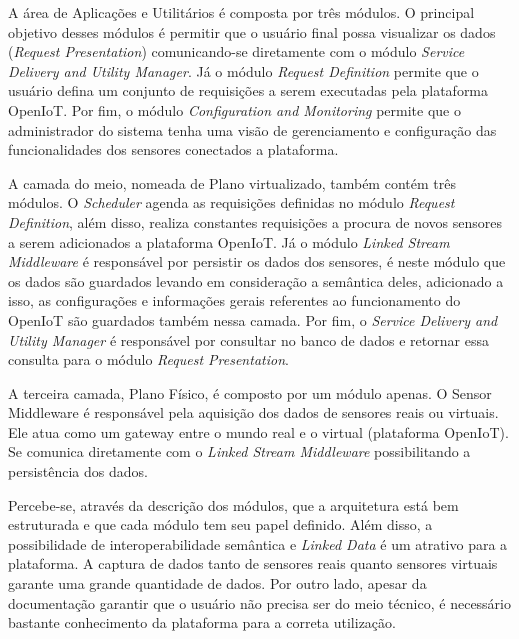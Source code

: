     
A área de Aplicações e Utilitários é composta por três módulos. O principal
objetivo desses módulos é permitir que o usuário final possa visualizar os
dados (\textit{Request Presentation}) comunicando-se diretamente com o módulo
\textit{Service Delivery and Utility Manager}.  Já o módulo \textit{Request
Definition} permite que o usuário defina um conjunto de requisições a serem
executadas pela plataforma OpenIoT. Por fim, o módulo \textit{Configuration and
Monitoring} permite que o administrador do sistema tenha uma visão de
gerenciamento e configuração das funcionalidades dos sensores conectados a
plataforma. 

A camada do meio, nomeada de Plano virtualizado, também contém três módulos. O
\textit{Scheduler} agenda as requisições definidas no módulo \textit{Request
Definition}, além disso, realiza constantes requisições a procura de novos
sensores a serem adicionados a plataforma OpenIoT. Já o módulo \textit{Linked
Stream Middleware} é responsável por persistir os dados dos sensores, é neste
módulo que os dados são guardados levando em consideração a semântica deles,
adicionado a isso, as configurações e informações gerais referentes ao
funcionamento do OpenIoT são guardados também nessa camada. Por fim, o
\textit{Service Delivery and Utility Manager} é responsável por consultar no
banco de dados e retornar essa consulta para o módulo \textit{Request
Presentation}.

A terceira camada, Plano Físico, é composto por um módulo apenas. O Sensor
Middleware é responsável pela aquisição dos dados de sensores reais ou
virtuais. Ele atua como um gateway entre o mundo real e o virtual (plataforma
OpenIoT). Se comunica diretamente com o \textit{Linked Stream Middleware}
possibilitando a persistência dos dados.

Percebe-se, através da descrição dos módulos, que a arquitetura está bem
estruturada e que cada módulo tem seu papel definido. Além disso, a
possibilidade de interoperabilidade semântica e \textit{Linked Data} é um
atrativo para a plataforma. A captura de dados tanto de sensores reais quanto
sensores virtuais garante uma grande quantidade de dados. Por outro lado,
apesar da documentação garantir que o usuário não precisa ser do meio técnico,
é necessário bastante conhecimento da plataforma para a correta utilização. 























